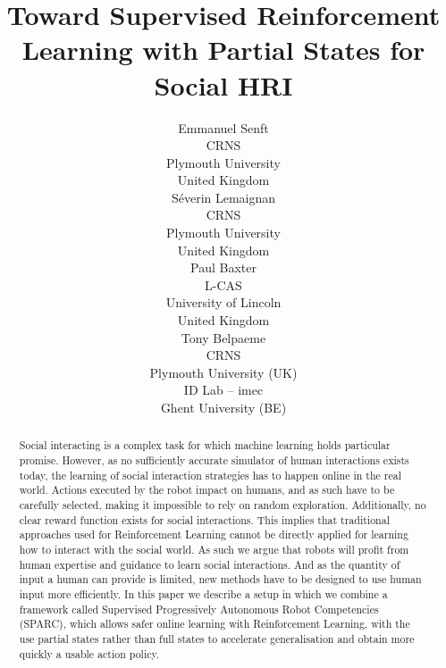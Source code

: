 \documentclass[letterpaper]{article} %
\begin{document}
%
\title{Toward Supervised Reinforcement Learning with Partial States for Social HRI}

\author{Emmanuel Senft \\
CRNS \\
Plymouth University \\
United Kingdom\\
\And S\'{e}verin Lemaignan\\
CRNS \\
Plymouth University \\
United Kingdom\\
\And Paul Baxter\\
L-CAS\\
University of Lincoln\\
United Kingdom\\
 \And Tony Belpaeme\\
 CRNS\\ Plymouth University (UK) \\ ID Lab -- imec \\ Ghent University (BE)}

\maketitle \begin{abstract}
    Social interacting is a complex task for which machine learning holds
    particular promise. However, as no sufficiently accurate simulator of human
    interactions exists today, the learning of social interaction strategies has
    to happen online in the real world. Actions executed by the robot impact on
    humans, and as such have to be carefully selected, making it impossible to
    rely on random exploration. Additionally, no clear reward function exists
    for social interactions. This implies that traditional approaches used for
    Reinforcement Learning cannot be directly applied for learning how to
    interact with the social world. As such we argue that robots will profit
    from human expertise and guidance to learn social interactions. And as the
    quantity of input a human can provide is limited, new methods have to be
    designed to use human input more efficiently. In this paper we describe a
    setup in which we combine a framework called Supervised Progressively
    Autonomous Robot Competencies (SPARC), which allows safer online learning
    with Reinforcement Learning, with the use partial states rather than full
    states to accelerate generalisation and obtain more quickly a usable action
    policy.  
\end{abstract}
\end{document}
